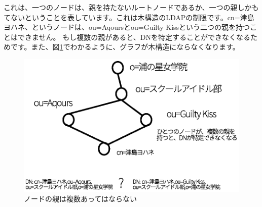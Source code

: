これは、一つのノードは、親を持たないルートノードであるか、一つの親しかもてないということを表しています。これは木構造のLDAPの制限です。cn=津島ヨハネ、というノードは、ou=Aqoursとou=Guilty Kissという二つの親を持つことはできません。
もし複数の親があると、DNを特定することができなくなるためです。また、図\ref{fig:error}でわかるように、グラフが木構造にならなくなります。

\begin{figure}[htbp]
	\includegraphics[width=12cm,clip]{draw/error.eps}
	\caption{ノードの親は複数あってはならない}
	\label{fig:error}
\end{figure}
